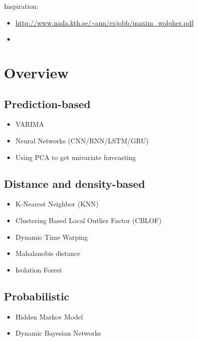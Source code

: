 Inspiration:
\begin{itemize}
    \item \url{http://www.nada.kth.se/~ann/exjobb/maxim_wolpher.pdf}
    \item \cite{Aggarwal2013a}
\end{itemize}

\section*{Overview}

\subsection{Prediction-based}

\begin{itemize}
    \item VARIMA \cite{Aggarwal2013a}
    \item Neural Networks (CNN/RNN/LSTM/GRU)
    \item Using PCA to get univariate forecasting \cite{Aggarwal2013a}

\end{itemize}

\subsection{Distance and density-based}

\begin{itemize}
    \item K-Nearest Neighbor (KNN) \cite{Li2019a}
    \item Clustering Based Local Outlier Factor (CBLOF) \cite{Li2019a}
    \item Dynamic Time Warping \cite{Aggarwal2013a}
    \item Mahalanobis distance \cite{Aggarwal2013a}
    \item Isolation Forest \cite{Liu2008}
\end{itemize}

\subsection{Probabilistic}

\begin{itemize}
    \item Hidden Markov Model \cite{Aggarwal2013a}
    \item Dynamic Bayesian Networks

\end{itemize}


